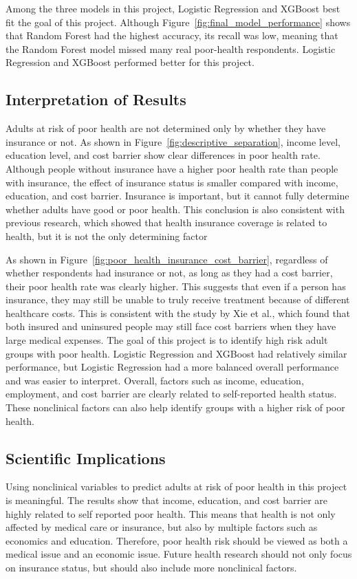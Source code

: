 Among the three models in this project, Logistic Regression and XGBoost best fit the goal of this project. Although Figure~\ref{fig:final_model_performance} shows that Random Forest had the highest accuracy, its recall was low, meaning that the Random Forest model missed many real poor-health respondents. Logistic Regression and XGBoost performed better for this project.

\subsection{Interpretation of Results}
Adults at risk of poor health are not determined only by whether they have insurance or not. As shown in Figure~\ref{fig:descriptive_separation}, income level, education level, and cost barrier show clear differences in poor health rate. Although people without insurance have a higher poor health rate than people with insurance, the effect of insurance status is smaller compared with income, education, and cost barrier. Insurance is important, but it cannot fully determine whether adults have good or poor health. This conclusion is also consistent with previous research, which showed that health insurance coverage is related to health, but it is not the only determining factor \cite{Sommers_Blendon_Orav_Epstein_2016}

As shown in Figure~\ref{fig:poor_health_insurance_cost_barrier}, regardless of whether respondents had insurance or not, as long as they had a cost barrier, their poor health rate was clearly higher. This suggests that even if a person has insurance, they may still be unable to truly receive treatment because of different healthcare costs. This is consistent with the study by Xie et al.\cite{Sudano_Baker_2003}, which found that both insured and uninsured people may still face cost barriers when they have large medical expenses.
The goal of this project is to identify high risk adult groups with poor health. Logistic Regression and XGBoost had relatively similar performance, but Logistic Regression had a more balanced overall performance and was easier to interpret. Overall, factors such as income, education, employment, and cost barrier are clearly related to self-reported health status. These nonclinical factors can also help identify groups with a higher risk of poor health.

\subsection{Scientific Implications}
Using nonclinical variables to predict adults at risk of poor health in this project is meaningful. The results show that income, education, and cost barrier are highly related to self reported poor health. This means that health is not only affected by medical care or insurance, but also by multiple factors such as economics and education. Therefore, poor health risk should be viewed as both a medical issue and an economic issue. Future health research should not only focus on insurance status, but should also include more nonclinical factors.

